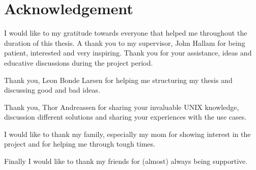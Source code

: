 {\let\clearpage\relax\chapter*{Acknowledgement}}

I would like to my gratitude towards everyone that helped me throughout the duration of this thesis. A thank you to my supervisor, John Hallam for being patient, interested and very inspiring. Thank you for your assistance, ideas and educative discussions during the project period. 

Thank you, Leon Bonde Larsen for helping me structuring my thesis and discussing good and bad ideas.

Thank you, Thor Andreassen for sharing your invaluable UNIX knowledge, discussion different solutions and sharing your experiences with the use cases.

I would like to thank my family, especially my mom for showing interest in the project and for helping me through tough times.

Finally I would like to thank my friends for (almost) always being supportive.



